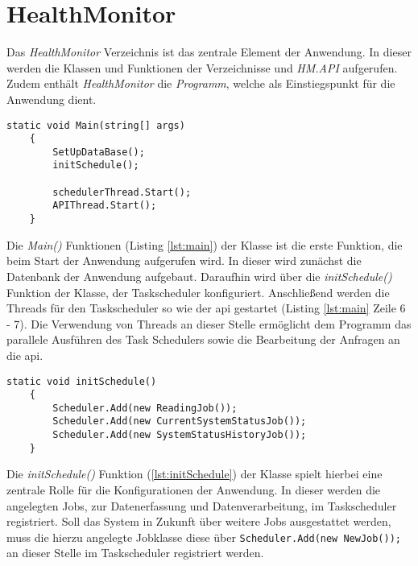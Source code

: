 \section{HealthMonitor}
Das \textit{HealthMonitor} Verzeichnis ist das zentrale Element der Anwendung. In dieser werden die Klassen und Funktionen der Verzeichnisse  und \textit{HM.API} aufgerufen. Zudem enthält \textit{HealthMonitor} die \textit{Programm}, welche als Einstiegspunkt für die Anwendung dient.\\
\begin{lstlisting}[caption={Einstiegspunkt der Anwendung}, label={lst:main}]
    static void Main(string[] args) 
    {
        SetUpDataBase();
        initSchedule();
        
        schedulerThread.Start();
        APIThread.Start();
    }
\end{lstlisting}
Die \textit{Main()} Funktionen (Listing \ref{lst:main}) der Klasse ist die erste Funktion, die beim Start der Anwendung aufgerufen wird. In dieser wird zunächst die Datenbank der Anwendung aufgebaut. Daraufhin wird über die \textit{initSchedule()} Funktion der Klasse, der Taskscheduler konfiguriert. Anschließend werden die Threads für den Taskscheduler so wie der \ac{api} gestartet (Listing \ref{lst:main} Zeile 6 - 7). Die Verwendung von Threads an dieser Stelle ermöglicht dem Programm das parallele Ausführen des Task Schedulers sowie die Bearbeitung der Anfragen an die \ac{api}.
\begin{lstlisting}[caption={Registrierung der Jobs im Taskscheduler}, label={lst:initSchedule}]
    static void initSchedule() 
    {
        Scheduler.Add(new ReadingJob());
        Scheduler.Add(new CurrentSystemStatusJob());
        Scheduler.Add(new SystemStatusHistoryJob());
    }
\end{lstlisting}
Die \textit{initSchedule()} Funktion (\ref{lst:initSchedule}) der Klasse spielt hierbei eine zentrale Rolle für die Konfigurationen der Anwendung. In dieser werden die angelegten Jobs, zur Datenerfassung und Datenverarbeitung, im Taskscheduler registriert. Soll das System in Zukunft über weitere Jobs ausgestattet werden, muss die hierzu angelegte Jobklasse diese über \lstinline$Scheduler.Add(new NewJob());$ an dieser Stelle im Taskscheduler registriert werden.   